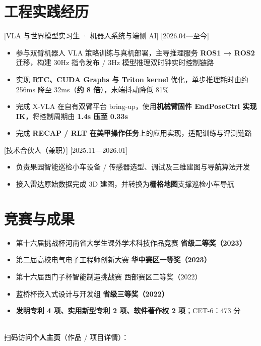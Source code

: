 \documentclass{resume-photo}
\newcommand{\hl}[1]{\textbf{\textcolor{hlred}{#1}}}
\begin{document}
\section{工程实践经历}

[\textnormal{VLA 与世界模型实习生 · 机器人系统与端侧 AI}]
[2026.04—至今]

\begin{itemize}
  \item 参与双臂机器人 VLA 策略训练与真机部署，主导推理服务 \hl{ROS1 → ROS2} 迁移，构建 30Hz 指令发布 / 3Hz 模型推理双时钟实时控制链路
  \item 实现 \hl{RTC、CUDA Graphs 与 Triton kernel} 优化，单步推理耗时由约 256ms 降至 32ms（\hl{约 8 倍}），末端抖动降低 81\%
  \item 完成 X-VLA 在自有双臂平台 bring-up，使用\hl{机械臂固件 EndPoseCtrl 实现 IK}，将控制周期由 \hl{1.4s 压至 0.33s}
  \item 完成 \hl{RECAP / RLT 在美甲操作任务}上的应用实现，适配训练与评测链路
\end{itemize}

[\textnormal{技术合伙人（兼职）}]
[2025.11—2026.01]

\begin{itemize}
  \item 负责果园智能巡检小车设备 / 传感器选型、调试及三维建图与导航算法开发
  \item 接入雷达原始数据完成 3D 建图，并转换为\hl{栅格地图}支撑巡检小车导航
\end{itemize}

\section{竞赛与成果}
\begin{itemize}
  \item 第十六届挑战杯河南省大学生课外学术科技作品竞赛 \hfill \hl{省级二等奖（2023）}
  \item 第二届高校电气电子工程师创新大赛 \hfill \hl{华中赛区一等奖（2023）}
  \item 第十六届西门子杯智能制造挑战赛 \hfill 西部赛区二等奖（2022）
  \item 蓝桥杯嵌入式设计与开发组 \hfill \hl{省级三等奖（2022）}
  \item \hl{发明专利 4 项、实用新型专利 2 项、软件著作权 2 项}；CET-6：473 分
\end{itemize}

\vfill
\begin{center}
  \\[4pt]
  {\footnotesize 扫码访问\hl{个人主页}（作品 / 项目详情）：}
\end{center}
\end{document}
